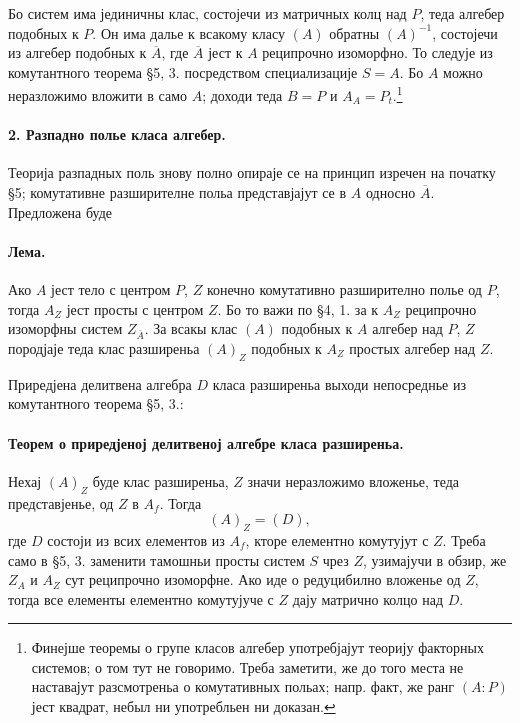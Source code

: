 ﻿\documentclass[11pt]{article}
\begin{document}
Бо систем има јединичны клас, состојечи из матричных колц над \(P\), теда алгебер подобных к \(P\). Он има далье к всакому класу \((A)\) обратны \((A)^{-1}\), состојечи из алгебер подобных к \(\overline A\), где \(\overline A\) јест к \(A\) реципрочно изоморфно. То следује из комутантного теорема §5, 3. посредством специализације \(S=A\). Бо \(A\) можно неразложимо вложити в само \(A\); доходи теда \(B=P\) и \(A_A=P_t\).\footnote{Финејше теоремы о групе класов алгебер употребјајут теорију факторных системов; о том тут не говоримо. Треба заметити, же до того места не наставајут разсмотреньа о комутативных польах; напр. факт, же ранг \((A:P)\) јест квадрат, небыл ни употребльен ни доказан.}

\paragraph{2. Разпадно полье класа алгебер.}
Теорија разпадных поль знову полно опираје се на принцип изречен на початку §5; комутативне разширителне польа представјајут се в \(A\) односно \(\overline A\). Предложена буде

\paragraph{Лема.}
Ако \(A\) јест тело с центром \(P\), \(Z\) конечно комутативно разширително полье од \(P\), тогда \(A_Z\) јест просты с центром \(Z\). Бо то важи по §4, 1. за к \(A_Z\) реципрочно изоморфны систем \(Z_{\overline A}\). За всакы клас \((A)\) подобных к \(A\) алгебер над \(P\), \(Z\) породјаје теда клас разширеньа \((A)_Z\) подобных к \(A_Z\) простых алгебер над \(Z\).

Приредјена делитвена алгебра \(D\) класа разширеньа выходи непосреднье из комутантного теорема §5, 3.:

\paragraph{Теорем о приредјеној делитвеној алгебре класа разширеньа.}
Нехај \((A)_Z\) буде клас разширеньа, \(Z\) значи неразложимо вложенье, теда представјенье, од \(Z\) в \(A_f\). Тогда
\[
        (A)_Z=(D),
\]
где \(D\) состоји из всих елементов из \(A_f\), кторе елементно комутујут с \(Z\). Треба само в §5, 3. заменити тамошньи просты систем \(S\) чрез \(Z\), узимајучи в обзир, же \(Z_A\) и \(A_Z\) сут реципрочно изоморфне. Ако иде о редуцибилно вложенье од \(Z\), тогда все елементы елементно комутујуче с \(Z\) дају матрично колцо над \(D\).
\end{document}
